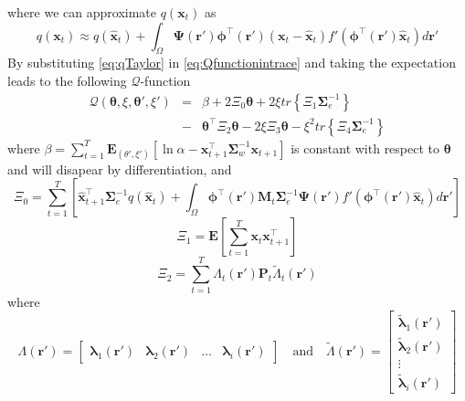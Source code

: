 \documentclass[]{article}
\begin{document}
where we can approximate $q(\mathbf x_t)$ as
\begin{equation}\label{eq:qTaylor}
 q(\mathbf x_t) \approx q(\mathbf {\hat x}_t)+\int_\Omega \boldsymbol{\Psi}(\mathbf{r}')\boldsymbol \phi^\top(\mathbf r') (\mathbf x_t - \mathbf  {\hat x}_t)f'(\boldsymbol \phi^\top(\mathbf r')\mathbf {\hat x}_t) d\mathbf{r}'
\end{equation}
By substituting \eqref{eq:qTaylor} in \eqref{eq:Qfunctionintrace}  and taking the expectation leads to the following  $\mathcal Q$-function
\begin{eqnarray}
 \mathcal Q(\boldsymbol \theta,\xi,\boldsymbol\theta',\xi')&=&\beta+2\Xi_0\boldsymbol\theta+
2\xi tr\left\lbrace \Xi_1 \boldsymbol\Sigma_e^{-1}\right\rbrace \nonumber \\
&-&\boldsymbol\theta^\top \Xi_2\boldsymbol\theta-2\xi \Xi_3 \boldsymbol\theta - \xi^2 tr \left\lbrace\Xi_4\boldsymbol\Sigma_e^{-1} \right\rbrace\nonumber
\end{eqnarray}
where $\beta= \sum_{t=1}^T\mathbf E_{(\theta',\xi')}[ \ln \alpha-\mathbf x_{t+1}^\top\boldsymbol\Sigma_w^{-1}\mathbf x_{t+1}]$ is constant with respect to $\boldsymbol \theta$ and will disapear by differentiation, and
\begin{equation}\label{eq:Xi0}
 \Xi_0=\sum_{t=1}^T\left[ \mathbf{\hat x}_{t+1}^\top\boldsymbol\Sigma_e^{-1}q(\mathbf{\hat x}_t)+\int_\Omega\boldsymbol \phi^\top(\mathbf r') \mathbf M_t \boldsymbol\Sigma_e^{-1}  \boldsymbol{\Psi}(\mathbf{r}') f'(\boldsymbol \phi^\top(\mathbf r')\mathbf {\hat x}_t) d\mathbf{r}'\right] 
\end{equation}
\begin{equation}\label{eq:Xi1}
 \Xi_1=\mathbf E[\sum_{t=1}^T\mathbf x_t\mathbf x_{t+1}^\top] 
\end{equation}
\begin{equation}
 \Xi_2=\sum_{t=1}^T\Lambda_t(\mathbf r')\mathbf P_t\tilde{\Lambda}_t(\mathbf r')
\end{equation}
where
\begin{equation}
 \Lambda(\mathbf r')=\begin{bmatrix}\boldsymbol \lambda_1(\mathbf r') & \boldsymbol \lambda_2(\mathbf r')& \dots &\boldsymbol \lambda_i(\mathbf r')\end{bmatrix} \quad \text{and} \quad \tilde{\Lambda}(\mathbf r')=\begin{bmatrix}\tilde{\boldsymbol \lambda}_1(\mathbf r') \\ \tilde{\boldsymbol \lambda}_2(\mathbf r') \\ \vdots \\ \tilde{\boldsymbol \lambda}_i(\mathbf r')\end{bmatrix}
\end{equation}
\end{document}
